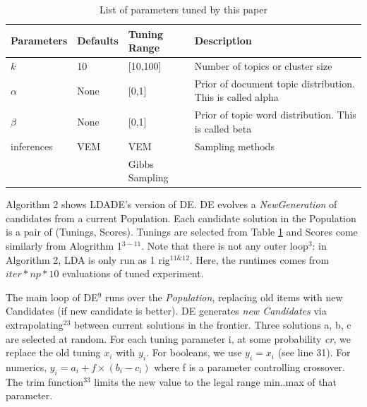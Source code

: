 \documentclass[10pt,conference]{IEEEtran}
\theoremstyle{break}
\begin{document}
\begin{table}[!htbp]
    \begin{center}
{\scriptsize
\begin{tabular}{|l|l|l|p{3.5cm}|}
        \hline 
        \textbf{Parameters} & \textbf{Defaults} & \textbf{Tuning Range} & \textbf{Description}\\
        \hline
        $k$ & 10 & [10,100] & Number of topics or cluster size \\ 
        \hline
       $\alpha$ & None & [0,1] & Prior of document topic distribution. This is called alpha \\ 
        \hline
        $\beta$ & None & [0,1] & Prior of topic word distribution. This is called  beta \\

        \hline
        inferences  & VEM & VEM    & Sampling methods \\
                  &     & Gibbs Sampling &\\
        \hline
\end{tabular}
}
\end{center}
\caption{List of parameters tuned by this paper}
\label{tb:tuned}
\end{table}

Algorithm 2 shows LDADE's version of DE.  DE evolves a \textit{NewGeneration} of
candidates from a current Population.   Each candidate solution in the Population is a pair of
(Tunings, Scores). Tunings are selected from Table \ref{tb:tuned} and Scores
come similarly from Alogrithm 1$^{3-11}$. Note that there is not any outer loop$^{3}$: in Algorithm 2, LDA is only run as 1 rig$^{11 \& 12}$. Here, the runtimes comes from $\mathit{iter} * np * 10$ evaluations of tuned experiment.



The main loop of DE$^{9}$ runs over the \textit{Population}, replacing old items with new Candidates (if new candidate is better).
DE generates \textit{new Candidates} via 
extrapolating$^{23}$ between current solutions in the frontier. Three solutions a, b, c\textit{} are
selected at random. For each tuning parameter i, at some probability \textit{cr}, we
replace the old tuning $x_i$ with $y_i$. For booleans, we use $y_i = x_i$ (see
line 31). For numerics, $y_i = a_i + f \times (b_i - c_i)$ where f is a
parameter controlling crossover. The trim function$^{33}$ limits the new value
to the legal range min..max of that parameter.
\end{document}
